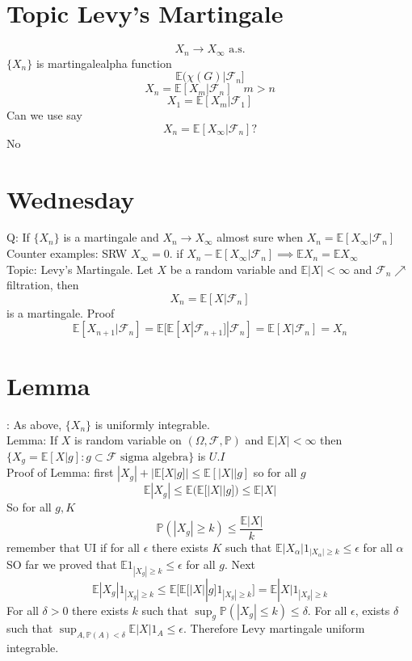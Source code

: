 \documentclass[11pt]{article}
\begin{document}
\section{Topic Levy's Martingale}
 \[
     X_n \rightarrow X_\infty \text{ a.s.}
\] 
$\{X_n\}$ is martingalealpha function
 \[
     \mathbb{E}(\chi(G) | \mathcal{F}_n]
\] 
\[
    X_n = \mathbb{E}[X_{m} | \mathcal{F}_n] \quad m > n
\] 
\[
    X_1 = \mathbb{E}[X_m | \mathcal{F}_1]
\] 
Can we use say
\[
    X_n = \mathbb{E}[X_\infty | \mathcal{F}_n] ?
\] 
No

\section{Wednesday}
Q: If $\{X_n\}$ is a martingale and  $X_n \to X_\infty$ almost sure when $X_n = \mathbb{E}[X_\infty | \mathcal{F}_n]$\\
Counter examples: SRW $X_\infty = 0$.
if $X_n - \mathbb{E}[X_\infty | \mathcal{F}_n] \implies \mathbb{E}X_n = \mathbb{E}X_\infty$\\
Topic: Levy's Martingale.
Let $X$ be a random variable and $ \mathbb{E}|X| < \infty$ and $ \mathcal{F}_n \nearrow $ filtration, then
\[
    X_n = \mathbb{E}[X | \mathcal{F}_n]
\] 
is a martingale. Proof
\[
    \mathbb{E}[X_{n+1}| \mathcal{F}_n] = \mathbb{E}[ \mathbb{E}[X | \mathcal{F}_{n+1}] | \mathcal{F}_n] = \mathbb{E}[X | \mathcal{F}_n] = X_n
\] 
\section{Lemma}: As above, $\{X_n\}$ is uniformly integrable.\\
Lemma: If $X$ is random variable on $(\Omega, \mathcal{F}, \mathbb{P})$ and $ \mathbb{E}|X| <\infty$ then $\{X_g = \mathbb{E}[X | g] : g \subset \mathcal{F} \text{ sigma algebra}\}$ is $U.I$\\
Proof of Lemma: first $|X_g| + | \mathbb{E}[X | g] | \le \mathbb{E}[|X| | g]$
so for all $g$
\[
    \mathbb{E}|X_g| \le \mathbb{E}( \mathbb{E}[|X| | g]) \le \mathbb{E}|X|
\] 
So for all $g, K$
 \[
\mathbb{P}(|X_g| \ge k) \le \frac{ \mathbb{E}|X|}{k}
\] 
remember that UI if for all $\epsilon$ there exists $K$ such that $ \mathbb{E}|X_\alpha| 1_{|X_\alpha| \ge k} \le \epsilon$ for all $\alpha$\\
SO far we proved that $ \mathbb{E} 1_{|X_g| \ge k} \le \epsilon$ for all $g$.
Next
\[
    \mathbb{E}|X_g|1_{|X_g| \ge k} \le \mathbb{E}[ \mathbb{E}[|X| | g]  1_{|X_g| \ge k}] = \mathbb{E} |X| 1_{|X_g| \ge k}
\] 
For all $\delta > 0$ there exists $k$ such that  $ \sup_g \mathbb{P}(|X_g| \le k) \le \delta$.
For all $\epsilon$, exists $\delta$ such that $\sup_{A, \mathbb{P}(A) < \delta} \mathbb{E}|X|1_{A} \le \epsilon$.
Therefore Levy martingale uniform integrable.
\end{document}
